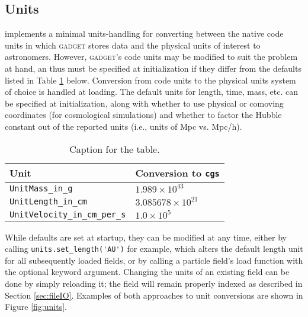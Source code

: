 \subsection{Units}
\label{sec:units}
 implements a minimal units-handling for converting between the native code units in which \textsc{gadget} stores data and the physical units of interest to astronomers.  
However, \textsc{gadget}'s code units may be modified to suit the problem at hand, an thus must be specified at  initialization if they differ from the defaults listed in Table \ref{code_unit_defaults} below.
Conversion from code units to the physical units system of choice is handled at loading.
The default units for length, time, mass, etc. can be specified at initialization, along with whether to use physical or comoving coordinates (for cosmological simulations) and whether to factor the Hubble constant out of the reported units (i.e., units of Mpc vs. Mpc/h).

\begin{table}[h!]
    \begin{tabular}{ll}
     \centering
      \caption{Caption for the table.}
      \label{code_unit_defaults}
        \hline \hline
        Unit & Conversion to \verb|cgs|\\
        \hline
        \verb|UnitMass_in_g| &  $1.989\times10^{43}$\\ 
        \verb|UnitLength_in_cm| & $3.085678\times10^{21}$ \\ 
        \verb|UnitVelocity_in_cm_per_s| & $1.0\times10^5$ \\ 
    \end{tabular} 
\end{table}

While defaults are set at startup, they can be modified at any time, either by calling \verb|units.set_length('AU')| for example, which alters the default length unit for all subsequently loaded fields, or by calling a particle field's load function with the optional  keyword argument.  
Changing the units of an existing field can be done by simply reloading it; the field will remain properly indexed as described in Section \ref{sec:fileIO}. Examples of both approaches to unit conversions are shown in Figure \ref{fig:units}.